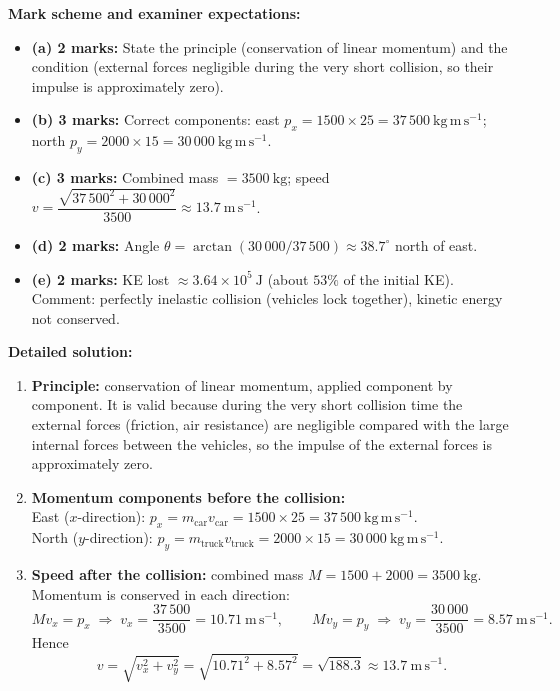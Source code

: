 \documentclass[11pt]{article}
\begin{document}
\begin{corrige}
\textbf{Mark scheme and examiner expectations:}
\begin{itemize}
\item \textbf{(a) 2 marks:} State the principle (conservation of linear momentum) and the condition (external forces negligible during the very short collision, so their impulse is approximately zero).
\item \textbf{(b) 3 marks:} Correct components: east $p_x = 1500 \times 25 = 37\,500\ \mathrm{kg\,m\,s^{-1}}$; north $p_y = 2000 \times 15 = 30\,000\ \mathrm{kg\,m\,s^{-1}}$.
\item \textbf{(c) 3 marks:} Combined mass $= 3500\ \mathrm{kg}$; speed $v = \dfrac{\sqrt{37\,500^2+30\,000^2}}{3500} \approx 13.7\ \mathrm{m\,s^{-1}}$.
\item \textbf{(d) 2 marks:} Angle $\theta = \arctan(30\,000/37\,500) \approx 38.7^\circ$ north of east.
\item \textbf{(e) 2 marks:} KE lost $\approx 3.64\times10^5\ \mathrm{J}$ (about $53\%$ of the initial KE). Comment: perfectly inelastic collision (vehicles lock together), kinetic energy not conserved.
\end{itemize}

\textbf{Detailed solution:}
\begin{enumerate}
\item \textbf{Principle:} conservation of linear momentum, applied component by component. It is valid because during the very short collision time the external forces (friction, air resistance) are negligible compared with the large internal forces between the vehicles, so the impulse of the external forces is approximately zero.

\item \textbf{Momentum components before the collision:} \\
East ($x$-direction): $p_x = m_{\mathrm{car}} v_{\mathrm{car}} = 1500 \times 25 = 37\,500\ \mathrm{kg\,m\,s^{-1}}$. \\
North ($y$-direction): $p_y = m_{\mathrm{truck}} v_{\mathrm{truck}} = 2000 \times 15 = 30\,000\ \mathrm{kg\,m\,s^{-1}}$.

\item \textbf{Speed after the collision:} combined mass $M = 1500+2000 = 3500\ \mathrm{kg}$. Momentum is conserved in each direction:
\[ M v_x = p_x \;\Rightarrow\; v_x = \frac{37\,500}{3500} = 10.71\ \mathrm{m\,s^{-1}}, \qquad
M v_y = p_y \;\Rightarrow\; v_y = \frac{30\,000}{3500} = 8.57\ \mathrm{m\,s^{-1}}. \]
Hence
\[ v = \sqrt{v_x^2+v_y^2} = \sqrt{10.71^2+8.57^2} = \sqrt{188.3} \approx 13.7\ \mathrm{m\,s^{-1}}. \]


\end{enumerate}
\end{corrige}
\end{document}
